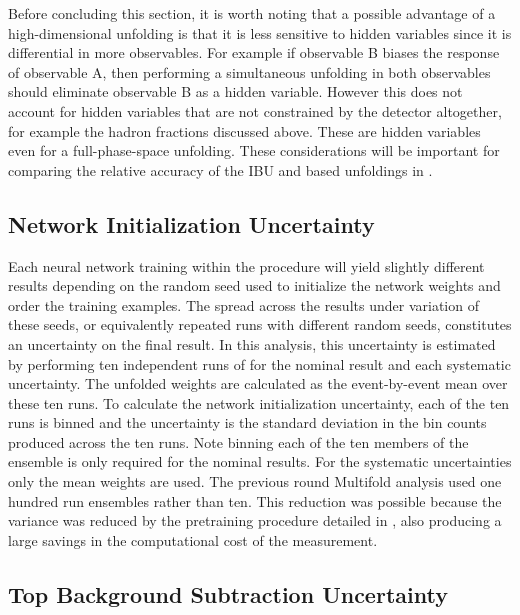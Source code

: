 Before concluding this section, it is worth noting that a possible advantage of a high-dimensional unfolding is that it is less sensitive to hidden variables since it is differential in more observables.
For example if observable B biases the response of observable A, then performing a simultaneous unfolding in both observables should eliminate observable B as a hidden variable.
However this does not account for hidden variables that are not constrained by the detector altogether, for example the hadron fractions discussed above.
These are hidden variables even for a full-phase-space unfolding.
These considerations will be important for comparing the relative accuracy of the IBU and \Omnifold based unfoldings in .

\FloatBarrier

\subsection{Network Initialization Uncertainty}
\label{sec:zjets-uncert-nninit}

Each neural network training within the \Omnifold procedure will yield slightly different results depending on the random seed used to initialize the network weights and order the training examples.
The spread across the \Omnifold results under variation of these seeds, or equivalently repeated runs with different random seeds, constitutes an uncertainty on the final result.
In this analysis, this uncertainty is estimated by performing ten independent runs of \Omnifold for the nominal result and each systematic uncertainty.
The unfolded weights are calculated as the event-by-event mean over these ten runs.
To calculate the network initialization uncertainty, each of the ten runs is binned and the uncertainty is the standard deviation in the bin counts produced across the ten runs.
Note binning each of the ten members of the ensemble is only required for the nominal results.
For the systematic uncertainties only the mean weights are used.
The previous round Multifold analysis used one hundred run ensembles rather than ten.
This reduction was possible because the variance was reduced by the pretraining procedure detailed in , also producing a large savings in the computational cost of the measurement.

\subsection{Top Background Subtraction Uncertainty}
\label{sec:zjets-uncert-top}

